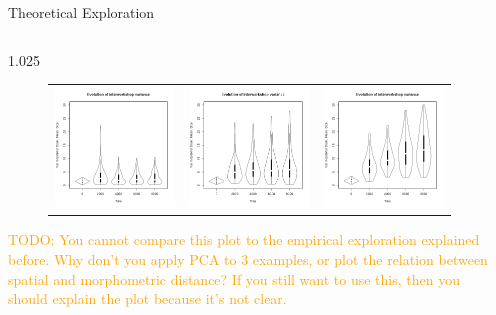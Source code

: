 \documentclass[final]{beamer}
\newlength{\sepwid}
\newlength{\onecolwid}
\newlength{\twocolwid}
\newcommand{\memo}[2]{\textcolor{#1}{#2}}
\newcommand{\xavi}[1]{\memo{orange}{TODO: #1\\}}
\begin{document}
\begin{frame}[t]
\begin{columns}[t]
\begin{column}{\twocolwid}
\begin{block}{Theoretical Exploration}
\begin{columns}[t,totalwidth=\twocolwid]
\begin{column}{1.025\onecolwid}
\begin{figure}[h!]
\begin{tabular}{ccc}
	    \includegraphics[height=.3\textwidth]{images/lineC.png}
	    &
	    \includegraphics[height=.3\textwidth]{images/cubeC.png}
	    &
	    \includegraphics[height=.3\textwidth]{images/lineNC.png}\\
	\end{tabular}
	\label{fig:resmod}
    \end{figure}

\xavi{You cannot compare this plot to the empirical exploration explained before. Why don't you apply PCA to 3 examples, or plot the relation between spatial and morphometric distance? If you still want to use this, then you should explain the plot because it's not clear.}

    
\end{column}
\end{columns}

\end{block}
\end{column}


\begin{column}{\sepwid}\end{column} %


\end{columns}
\end{frame}
\end{document}
